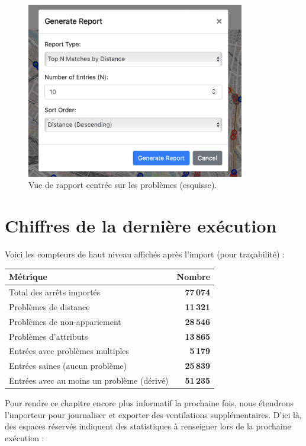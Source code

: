 \begin{figure}[h]
  \centering
  \includegraphics[width=0.85\textwidth]{../figures/webapp/report.png}
  \caption{Vue de rapport centrée sur les problèmes (esquisse).}
\end{figure}

\section{Chiffres de la dernière exécution}
Voici les compteurs de haut niveau affichés après l'import (pour traçabilité) :

\begin{center}
\small
\begin{tabular}{l r}
\toprule
Métrique & Nombre \\
\midrule
Total des arrêts importés & \textbf{77\,074} \\
Problèmes de distance & \textbf{11\,321} \\
Problèmes de non-appariement & \textbf{28\,546} \\
Problèmes d'attributs & \textbf{13\,865} \\
Entrées avec problèmes multiples & \textbf{5\,179} \\
Entrées saines (aucun problème) & \textbf{25\,839} \\
\midrule
Entrées avec au moins un problème (dérivé) & \textbf{51\,235} \\
\bottomrule
\end{tabular}
\end{center}

\noindent Pour rendre ce chapitre encore plus informatif la prochaine fois, nous étendrons l'importeur pour journaliser et exporter des ventilations supplémentaires. D'ici là, des espaces réservés indiquent des statistiques à renseigner lors de la prochaine exécution :

